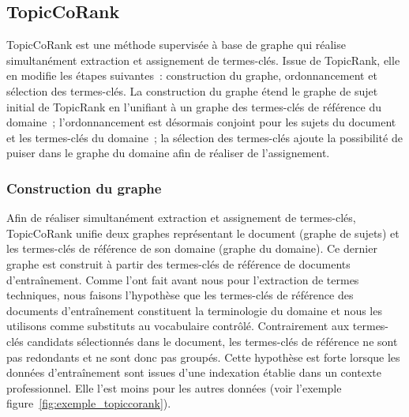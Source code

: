   \subsection{TopicCoRank}
  \label{subsec:main-domain_specific_keyphrase_annotation-supervised_automatic_keyphrase_annotation-topiccorank}
    TopicCoRank est une méthode supervisée à base de graphe qui réalise
    simultanément extraction et assignement de termes-clés. Issue de
    TopicRank, elle en modifie les étapes suivantes~: construction du graphe,
    ordonnancement et sélection des termes-clés. La construction du graphe
    étend le graphe de sujet initial de TopicRank en l'unifiant à un graphe
    des termes-clés de référence du domaine~; l'ordonnancement est désormais
    conjoint pour les sujets du document et les termes-clés du domaine~; la
    sélection des termes-clés ajoute la possibilité de puiser dans le graphe
    du domaine afin de réaliser de l'assignement.

    \subsubsection{Construction du graphe}
    \label{subsubsec:main-domain_specific_keyphrase_annotation-supervised_automatic_keyphrase_extraction-topiccorank-graph_construction}
      Afin de réaliser simultanément extraction et assignement de termes-clés,
      TopicCoRank unifie deux graphes représentant le document (graphe de
      sujets) et les termes-clés de référence de son domaine (graphe du
      domaine). Ce dernier graphe est construit à partir des termes-clés de
      référence de documents d'entraînement. Comme  l'ont
      fait avant nous pour l'extraction de termes techniques, nous faisons
      l'hypothèse que les termes-clés de référence des documents
      d'entraînement constituent la terminologie du domaine et nous les
      utilisons comme substituts au vocabulaire contrôlé. Contrairement aux
      termes-clés candidats sélectionnés dans le document, les termes-clés de
      référence ne sont pas redondants et ne sont donc pas groupés. Cette
      hypothèse est forte lorsque les données d'entraînement sont
      issues d'une indexation établie dans un contexte professionnel. Elle
      l'est moins pour les autres données (voir l'exemple figure~\ref{fig:exemple_topiccorank}).

